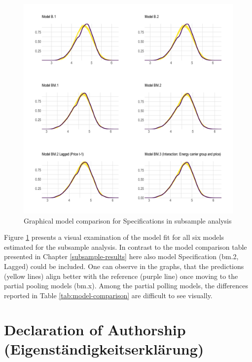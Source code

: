 \documentclass[12pt,twoside]{reedthesis}
\begin{document}
\newpage
\begin{figure}

{\centering \includegraphics[width=1\linewidth]{figure/plot-model-comparison} 

}

\caption{Graphical model comparison for Specifications in subsample analysis}\label{fig:plot-model-comparison}
\end{figure}
\noindent
Figure \ref{fig:plot-model-comparison} presents a visual examination of the model fit for all six models estimated for the subsample analysis. In contrast to the model comparison table presented in Chapter \ref{subsample-results} here also model Specification (bm.2, Lagged) could be included. One can observe in the graphs, that the predictions (yellow lines) align better with the reference (purple line) once moving to the partial pooling models (bm.x). Among the partial polling models, the differences reported in Table \ref{tab:model-comparison} are difficult to see visually.

\newpage

\onehalfspacing

\hypertarget{declaration-of-authorship-eigenstuxe4ndigkeitserkluxe4rung}{%
\chapter*{Declaration of Authorship (Eigenständigkeitserklärung)}\label{declaration-of-authorship-eigenstuxe4ndigkeitserkluxe4rung}}
\end{document}
